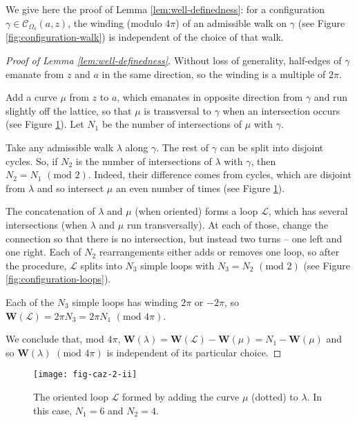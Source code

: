 \documentclass[oneside,english]{amsart}
\numberwithin{equation}{section}
\numberwithin{figure}{section}
\theoremstyle{plain}
\theoremstyle{plain}
\theoremstyle{plain}
\theoremstyle{plain}
\theoremstyle{plain}
\theoremstyle{definition}
\theoremstyle{remark}
\begin{document}
We give here the proof of Lemma \ref{lem:well-definedness}: for a
configuration $\gamma\in\mathcal{C}_{\Omega_{\delta}}\left(a,z\right)$,
the winding (modulo $4\pi$) of an admissible walk on $\gamma$ (see
Figure \ref{fig:configuration-walk}) is independent of the choice
of that walk.
\begin{proof}[Proof of Lemma \ref{lem:well-definedness}]
Without loss of generality, half-edges of $\gamma$ emanate from
$z$ and $a$ in the same direction, so the winding is a multiple
of $2\pi$.

Add a curve $\mu$ from $z$ to $a$, which emanates in opposite direction
from $\gamma$ and run slightly off the lattice, so that $\mu$ is
transversal to $\gamma$ when an intersection occurs (see Figure \ref{fig:configuration-loop}).
Let $N_{1}$ be the number of intersections of $\mu$ with $\gamma$.

Take any admissible walk $\lambda$ along $\gamma$. The rest of $\gamma$
can be split into disjoint cycles. So, if $N_{2}$ is the number of
intersections of $\lambda$ with $\gamma$, then $N_{2}=N_{1}\,\,(\mathrm{mod}\,\,2)$.
Indeed, their difference comes from cycles, which are disjoint from
$\lambda$ and so intersect $\mu$ an even number of times (see Figure
\ref{fig:configuration-loop}).

The concatenation of $\lambda$ and $\mu$ (when oriented) forms a
loop $\mathcal{L}$, which has several intersections (when $\lambda$
and $\mu$ run transversally). At each of those, change the connection
so that there is no intersection, but instead two turns -- one left
and one right. Each of $N_{2}$ rearrangements either adds or removes
one loop, so after the procedure, $\mathcal{L}$ splits into $N_{3}$
simple loops with $N_{3}=N_{2}\,\,(\mathrm{mod}\,\,2)$ (see Figure
\ref{fig:configuration-loops}).

Each of the $N_{3}$ simple loops has winding $2\pi$ or $-2\pi$,
so $\mathbf{W}\left(\mathcal{L}\right)=2\pi N_{3}=2\pi N_{1}\,\,(\mathrm{mod}\,\,4\pi)$.

We conclude that, mod $4\pi$, $\mathbf{W}(\lambda)=\mathbf{W}(\mathcal{L})-\mathbf{W}(\mu)=N_{1}-\mathbf{W}(\mu)$
and so $\mathbf{W}(\lambda)\,\,\left(\mathrm{mod}\,\,4\pi\right)$
is independent of its particular choice.
\end{proof}
\begin{figure}
\texttt{[image: fig-caz-2-ii]}

\caption{\label{fig:configuration-loop}The oriented loop\emph{ $\mathcal{L}$}
formed by adding the curve $\mu$ (dotted) to $\lambda$. In this
case, $N_{1}=6$ and $N_{2}=4$. }
\end{figure}
\end{document}
